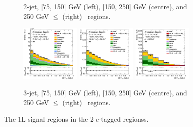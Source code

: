 \begin{figure}[h!]
\begin{subfigure}[b]{\textwidth}
        \caption{2-jet, [75, 150] GeV (left), [150, 250] GeV (centre), and 250  GeV $\leq$ (right) \ptv\ regions.}
        \label{fig:plots_VHcc_1L_SR_2J_2c}
    \end{subfigure}
    \begin{subfigure}[b]{\textwidth}
        \centering
        \includegraphics[width=0.32\textwidth]{Images/VH/Own_fit/postfit_VHcc/Region_distmva_BMax150_BMin75_DSR_J3_TTypext_T2_L1_Y6051_GlobalFit_conditionnal_mu1.png}
        \includegraphics[width=0.32\textwidth]{Images/VH/Own_fit/postfit_VHcc/Region_distmva_BMax250_BMin150_DSR_J3_TTypext_T2_L1_Y6051_GlobalFit_conditionnal_mu1.png}
        \includegraphics[width=0.32\textwidth]{Images/VH/Own_fit/postfit_VHcc/Region_distmva_BMin250_DSR_J3_TTypext_T2_L1_Y6051_GlobalFit_conditionnal_mu1.png}
        \caption{3-jet, [75, 150] GeV (left), [150, 250] GeV (centre), and 250  GeV $\leq$ (right) \ptv\ regions.}
        \label{fig:plots_VHcc_1L_SR_3J_2c}
    \end{subfigure}
    \caption{The 1L signal regions in the 2 $c$-tagged regionss.}
    \label{fig:plots_VHcc_1L_SR_2c}
\end{figure}
